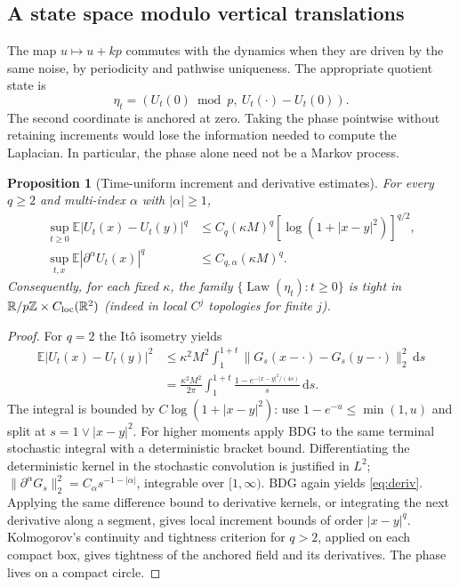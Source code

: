 \documentclass[11pt]{article}
\numberwithin{equation}{section}
\newtheorem{proposition}[theorem]{Proposition}
\theoremstyle{definition}
\theoremstyle{remark}
\newcommand{\R}{\mathbb R}
\newcommand{\E}{\mathbb E}
\newcommand{\dd}{\,\mathrm d}
\newcommand{\Law}{\operatorname{Law}}
\begin{document}
\subsection{A state space modulo vertical translations}
The map $u\mapsto u+kp$ commutes with the dynamics when they are driven by the same noise, by periodicity and pathwise uniqueness. The appropriate quotient state is
\begin{equation}\label{eq:quotient}
 \eta_t=(U_t(0)\bmod p,\ U_t(\cdot)-U_t(0)).
\end{equation}
The second coordinate is anchored at zero. Taking the phase pointwise without retaining increments would lose the information needed to compute the Laplacian. In particular, the phase alone need not be a Markov process.
\begin{proposition}[Time-uniform increment and derivative estimates]\label{prop:increments}
For every $q\ge2$ and multi-index $\alpha$ with $|\alpha|\ge1$,
\begin{align}
 \sup_{t\ge0}\E|U_t(x)-U_t(y)|^q
 &\le C_q(\kappa M)^q[\log(1+|x-y|^2)]^{q/2},\label{eq:increment}\\
 \sup_{t,x}\E|\partial^\alpha U_t(x)|^q
 &\le C_{q,\alpha}(\kappa M)^q.\label{eq:deriv}
\end{align}
Consequently, for each fixed $\kappa$, the family $\{\Law(\eta_t):t\ge0\}$ is tight in $\R/p\mathbb Z\times C_{\rm loc}(\R^2)$ (indeed in local $C^j$ topologies for finite $j$).
\end{proposition}
\begin{proof}
For $q=2$ the It\^o isometry yields
\begin{align*}
 \E|U_t(x)-U_t(y)|^2
 &\le \kappa^2M^2\int_1^{1+t}
 \|G_s(x-\cdot)-G_s(y-\cdot)\|_2^2\dd s\\
 &=\frac{\kappa^2M^2}{2\pi}\int_1^{1+t}\frac{1-e^{-|x-y|^2/(4s)}}s\dd s.
\end{align*}
The integral is bounded by $C\log(1+|x-y|^2)$: use $1-e^{-u}\le \min(1,u)$ and split at $s=1\vee |x-y|^2$. For higher moments apply BDG to the same terminal stochastic integral with a deterministic bracket bound. Differentiating the deterministic kernel in the stochastic convolution is justified in $L^2$; $\|\partial^\alpha G_s\|_2^2=C_\alpha s^{-1-|\alpha|}$, integrable over $[1,\infty)$. BDG again yields \eqref{eq:deriv}. Applying the same difference bound to derivative kernels, or integrating the next derivative along a segment, gives local increment bounds of order $|x-y|^q$. Kolmogorov's continuity and tightness criterion for $q>2$, applied on each compact box, gives tightness of the anchored field and its derivatives. The phase lives on a compact circle.
\end{proof}
\end{document}

